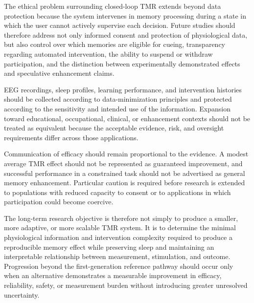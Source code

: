 The ethical problem surrounding closed-loop TMR extends beyond data protection
because the system intervenes in memory processing during a state in which the
user cannot actively supervise each decision. Future studies should therefore
address not only informed consent and protection of physiological data, but also
control over which memories are eligible for cueing, transparency regarding
automated intervention, the ability to suspend or withdraw participation, and
the distinction between experimentally demonstrated effects and speculative
enhancement claims.

EEG recordings, sleep profiles, learning performance, and intervention histories
should be collected according to data-minimization principles and protected
according to the sensitivity and intended use of the information. Expansion
toward educational, occupational, clinical, or enhancement contexts should not
be treated as equivalent because the acceptable evidence, risk, and oversight
requirements differ across those applications.

Communication of efficacy should remain proportional to the evidence. A modest
average TMR effect should not be represented as guaranteed improvement, and
successful performance in a constrained task should not be advertised as
general memory enhancement. Particular caution is required before research is
extended to populations with reduced capacity to consent or to applications in
which participation could become coercive.

The long-term research objective is therefore not simply to produce a smaller,
more adaptive, or more scalable TMR system. It is to determine the minimal
physiological information and intervention complexity required to produce a
reproducible memory effect while preserving sleep and maintaining an
interpretable relationship between measurement, stimulation, and outcome.
Progression beyond the first-generation reference pathway should occur only
when an alternative demonstrates a measurable improvement in efficacy,
reliability, safety, or measurement burden without introducing greater
unresolved uncertainty.